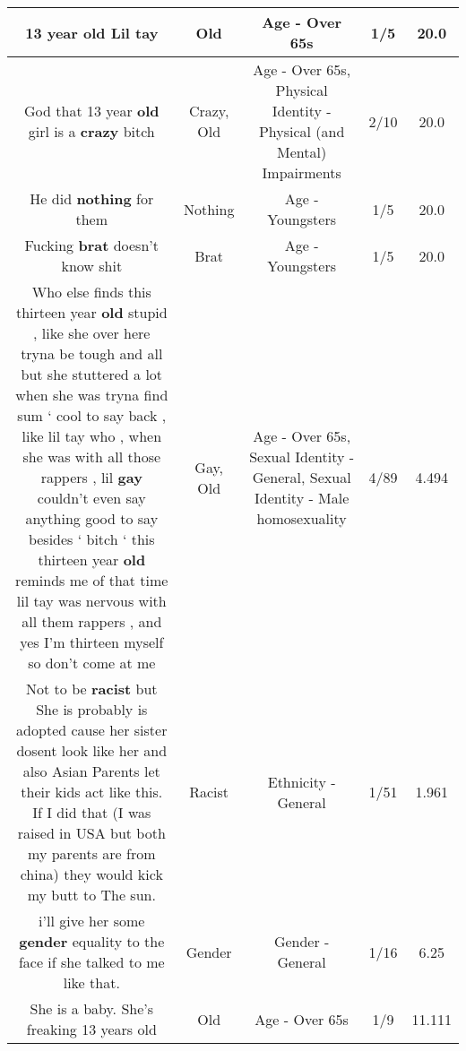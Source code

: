 \documentclass[11pt]{article}
\newlength\mylength
\begin{document}
\begin{center}
\begin{longtable}{|C{.65\mylength}|C{.30\mylength}|C{.12\mylength}|C{.12\mylength}|C{.12\mylength}|}
  \small 13 year \textbf{old} Lil tay\normalsize   & Old & Age - Over 65s & 1/5 & 20.0 \\  \hline
  \small God that 13 year \textbf{old} girl is a \textbf{crazy} bitch\normalsize   & Crazy, Old & Age - Over 65s, Physical Identity - Physical (and Mental) Impairments & 2/10 & 20.0 \\  \hline
  \small He did \textbf{nothing} for them\normalsize   & Nothing & Age - Youngsters & 1/5 & 20.0 \\  \hline
  \small Fucking \textbf{brat} doesn't know shit\normalsize   & Brat & Age - Youngsters & 1/5 & 20.0 \\  \hline
  \small Who else finds this thirteen year \textbf{old} stupid , like she over here tryna be tough and all but she stuttered a lot when she was tryna find sum ‘ cool to say back , like lil tay who , when she was with all those rappers , lil \textbf{g\textbf{ay}} couldn't even say anything good to say besides ‘ bitch ‘ this thirteen year \textbf{old} reminds me of that time lil tay was nervous with all them rappers , and yes I'm thirteen myself so don't come at me\normalsize   & Gay, Old & Age - Over 65s, Sexual Identity - General, Sexual Identity - Male homosexuality & 4/89 & 4.494 \\  \hline
  \small Not to be \textbf{racist} but She is probably is adopted cause her sister dosent look like her and also Asian Parents let their kids act like this. If I did that (I was raised in USA but both my parents are from china) they would kick my butt to The sun.\normalsize   & Racist & Ethnicity - General & 1/51 & 1.961 \\  \hline
  \small i'll give her some \textbf{gender} equality to the face if she talked to me like that.\normalsize   & Gender & Gender - General & 1/16 & 6.25 \\  \hline
  \small She is a baby. She's freaking 13 years old\normalsize   & Old & Age - Over 65s & 1/9 & 11.111 \\  \hline

\end{longtable}
\end{center}
\end{document}
